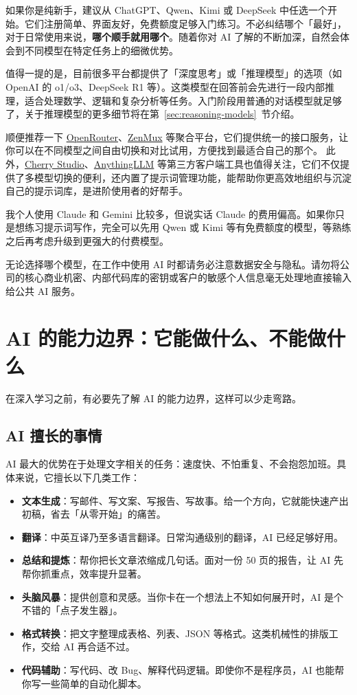 如果你是纯新手，建议从 ChatGPT、Qwen、Kimi 或 DeepSeek 中任选一个开始。它们注册简单、界面友好，免费额度足够入门练习。不必纠结哪个「最好」，对于日常使用来说，\textbf{哪个顺手就用哪个}。随着你对 AI 了解的不断加深，自然会体会到不同模型在特定任务上的细微优势。

值得一提的是，目前很多平台都提供了「深度思考」或「推理模型」的选项（如 OpenAI 的 o1/o3、DeepSeek R1 等）。这类模型在回答前会先进行一段内部推理，适合处理数学、逻辑和复杂分析等任务。入门阶段用普通的对话模型就足够了，关于推理模型的更多细节将在第~\ref{sec:reasoning-models}~节介绍。

顺便推荐一下 \href{https://openrouter.ai}{OpenRouter}、\href{https://zenmux.ai}{ZenMux} 等聚合平台，它们提供统一的接口服务，让你可以在不同模型之间自由切换和对比试用，方便找到最适合自己的那个。
此外，\href{https://cherry-ai.com}{Cherry Studio}、\href{https://anythingllm.com}{AnythingLLM} 等第三方客户端工具也值得关注，它们不仅提供了多模型切换的便利，还内置了提示词管理功能，能帮助你更高效地组织与沉淀自己的提示词库，是进阶使用者的好帮手。

我个人使用 Claude 和 Gemini 比较多，但说实话 Claude 的费用偏高。如果你只是想练习提示词写作，完全可以先用 Qwen 或 Kimi 等有免费额度的模型，等熟练之后再考虑升级到更强大的付费模型。

\begin{tipbox}
无论选择哪个模型，在工作中使用 AI 时都请务必注意数据安全与隐私。请勿将公司的核心商业机密、内部代码库的密钥或客户的敏感个人信息毫无处理地直接输入给公共 AI 服务。
\end{tipbox}

\section{AI 的能力边界：它能做什么、不能做什么}

在深入学习之前，有必要先了解 AI 的能力边界，这样可以少走弯路。

\subsection*{AI 擅长的事情}

AI 最大的优势在于处理文字相关的任务：速度快、不怕重复、不会抱怨加班。具体来说，它擅长以下几类工作：

\begin{itemize}
  \item \textbf{文本生成}：写邮件、写文案、写报告、写故事。给一个方向，它就能快速产出初稿，省去「从零开始」的痛苦。
  \item \textbf{翻译}：中英互译乃至多语言翻译。日常沟通级别的翻译，AI 已经足够好用。
  \item \textbf{总结和提炼}：帮你把长文章浓缩成几句话。面对一份 50 页的报告，让 AI 先帮你抓重点，效率提升显著。
  \item \textbf{头脑风暴}：提供创意和灵感。当你卡在一个想法上不知如何展开时，AI 是个不错的「点子发生器」。
  \item \textbf{格式转换}：把文字整理成表格、列表、JSON 等格式。这类机械性的排版工作，交给 AI 再合适不过。
  \item \textbf{代码辅助}：写代码、改 Bug、解释代码逻辑。即使你不是程序员，AI 也能帮你写一些简单的自动化脚本。
\end{itemize}

